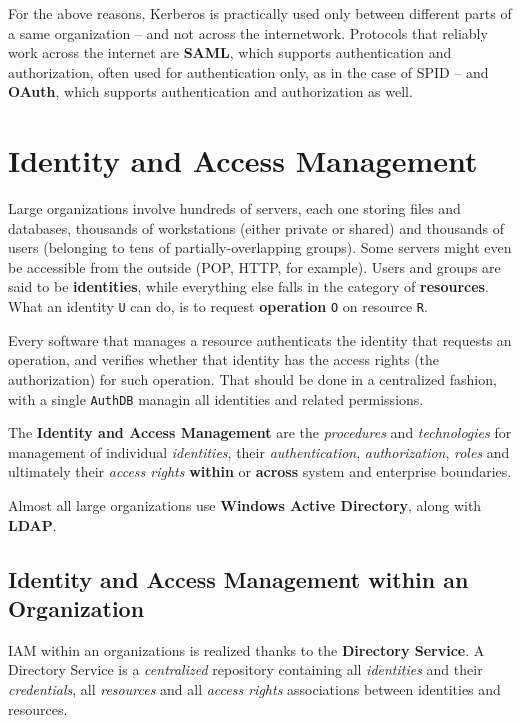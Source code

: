 \documentclass[10pt]{extbook}
\begin{document}
For the above reasons, Kerberos is practically used only between different
parts of a same organization -- and not across the internetwork. Protocols that
reliably work across the internet are \textbf{SAML}, which supports
authentication and authorization, often used for authentication only, as in the
case of SPID -- and \textbf{OAuth}, which supports authentication and
authorization as well.






\chapter{Identity and Access Management}

Large organizations involve hundreds of servers, each one storing files and
databases, thousands of workstations (either private or shared) and thousands
of users (belonging to tens of partially\--overlapping groups). Some servers
might even be accessible from the outside (POP, HTTP, for example). Users and
groups are said to be \textbf{identities}, while everything else falls in the
category of \textbf{resources}. What an identity \texttt{U} can do, is to
request \textbf{operation} \texttt{O} on resource \texttt{R}. 

Every software that manages a resource authenticats the identity that requests
an operation, and verifies whether that identity has the access rights (the
authorization) for such operation. That should be done in a centralized
fashion, with a single \texttt{AuthDB} managin all identities and related
permissions.

The \textbf{Identity and Access Management} are the \emph{procedures} and
\emph{technologies} for management of individual \emph{identities}, their
\emph{authentication}, \emph{authorization}, \emph{roles} and ultimately their
\emph{access rights} \textbf{within} or \textbf{across} system and enterprise
boundaries.

Almost all large organizations use \textbf{Windows Active Directory}, along
with \textbf{LDAP}.

\section{Identity and Access Management within an Organization}

IAM within an organizations is realized thanks to the \textbf{Directory
Service}. A Directory Service is a \emph{centralized} repository containing all
\emph{identities} and their \emph{credentials}, all \emph{resources} and all
\emph{access rights} associations between identities and resources.
\end{document}
